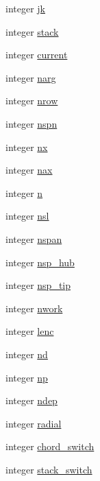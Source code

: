 \begin{DoxyCompactItemize}
integer \hyperlink{namespaceglobvar_a63113b636acdd2b247b3e2df6cdac555}{jk}
\item 
integer \hyperlink{namespaceglobvar_af2a9883201aae595b762ba7ca329a73e}{stack}
\item 
integer \hyperlink{namespaceglobvar_ab96395218a22f28f54d4972183ff613b}{current}
\item 
integer \hyperlink{namespaceglobvar_a3b61c37b105aa02078586405cc370389}{narg}
\item 
integer \hyperlink{namespaceglobvar_a800cf6c01b61ed57a87bd315e1d9efa2}{nrow}
\item 
integer \hyperlink{namespaceglobvar_a893893112c0ec18c6931ce39f595fd96}{nspn}
\item 
integer \hyperlink{namespaceglobvar_ae4d2e4d1bd4180999afe29337165e1e6}{nx}
\item 
integer \hyperlink{namespaceglobvar_acff3033374e6d73d14fb06fc53fc205c}{nax}
\item 
integer \hyperlink{namespaceglobvar_ae2a801b02d21360936653383c17f8310}{n}
\item 
integer \hyperlink{namespaceglobvar_a5ffdff1f4afd2fecd622bee9fbe37442}{nsl}
\item 
integer \hyperlink{namespaceglobvar_adeb7d084c25deee7802eab03d40830c5}{nspan}
\item 
integer \hyperlink{namespaceglobvar_a2102305906fb17109fa9be746d11cf64}{nsp\+\_\+hub}
\item 
integer \hyperlink{namespaceglobvar_a0fe2d3e9a20697e0e419f91d67295872}{nsp\+\_\+tip}
\item 
integer \hyperlink{namespaceglobvar_a14eadfde6f84c7aec720cf0c0e828e3a}{nwork}
\item 
integer \hyperlink{namespaceglobvar_a00121cf01b80ef938df02e8b6a38231c}{lenc}
\item 
integer \hyperlink{namespaceglobvar_abefec70ea6b9f0d35b7cc330cd8ed601}{nd}
\item 
integer \hyperlink{namespaceglobvar_ab80f0f7f25dc40712c12c67edf2c7112}{np}
\item 
integer \hyperlink{namespaceglobvar_aee337eea7ab22193aa48bfd1dfe306d1}{ndep}
\item 
integer \hyperlink{namespaceglobvar_aff92f6272423850960736a1d45667121}{radial}
\item 
integer \hyperlink{namespaceglobvar_a43852fe59e4847373e97ec738fcd12cf}{chord\+\_\+switch}
\item 
integer \hyperlink{namespaceglobvar_a795725a0e45ccc9a453ce62e4311aa86}{stack\+\_\+switch}
\item 

\end{DoxyCompactItemize}
